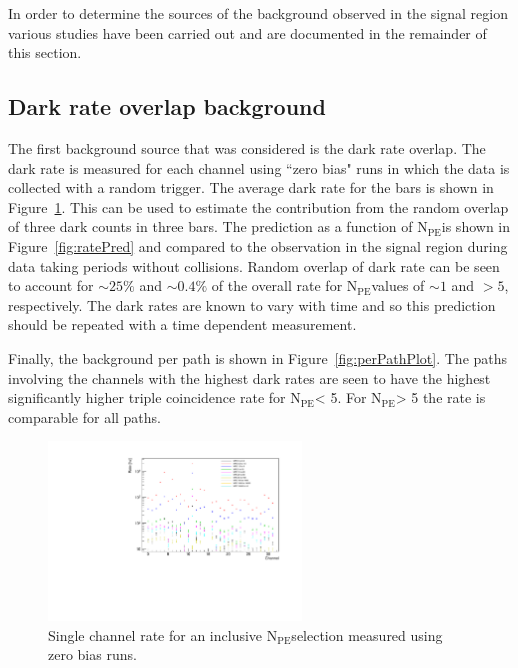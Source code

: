 \documentclass[12pt]{article}
\newcommand{\npe} {\mbox{\ensuremath{\textrm{N}_\textrm{PE}}\xspace}}
\begin{document}
In order to determine the sources of the background observed in the signal region 
various studies have been carried out and are documented in the remainder of this section.

\subsection{Dark rate overlap background}

The first background source that was considered is the dark rate overlap. The dark rate is measured
for each channel using ``zero bias" runs in which the data is collected with a random trigger.
The average dark rate for the bars is shown in Figure~\ref{fig:darkRate}. This can be used to estimate the 
contribution from the random overlap of three dark counts in three bars. 
The prediction as a function of \npe is shown in Figure~\ref{fig:ratePred} and 
compared to the observation in the signal region during data taking periods without collisions. 
Random overlap of dark rate can be seen to account for $\sim25\%$ and $\sim0.4\%$ 
of the overall rate for \npe values of $\sim 1$ and $> 5$, respectively. The dark rates are 
known to vary with time and so this prediction should be repeated with a time
dependent measurement.

Finally, the background per path is shown in Figure~\ref{fig:perPathPlot}. The paths involving
the channels with the highest dark rates are seen to have the highest 
significantly higher triple coincidence rate for \npe < 5. For \npe > 5 the
rate is comparable for all paths.
\begin{figure}[ht!]
    \centering
    \includegraphics[width=0.6\textwidth]{figures/singlesRatesUnbiasedQuietSinglePulseInChanHeightAllUnbiasedBinnedAsSignal}
    \caption{\label{fig:darkRate} Single channel rate for an inclusive \npe selection measured using zero bias runs.}
\end{figure}
\end{document}
